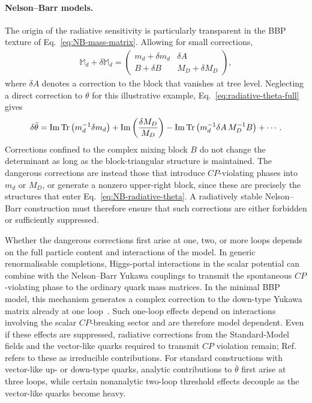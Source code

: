 \documentclass[review]{elsarticle}
\numberwithin{equation}{section}
\numberwithin{table}{section}
\numberwithin{figure}{section}
\def\tr{\mathrm{Tr}}
\begin{document}
\paragraph{Nelson--Barr models.}

The origin of the radiative sensitivity is particularly transparent in the BBP texture of Eq.~\eqref{eq:NB-mass-matrix}. Allowing for small corrections,
\begin{align}
    \mathbb M_d+\delta\mathbb M_d =
    \begin{pmatrix}
        m_d+\delta m_d & \delta A\\
        B+\delta B & M_D+\delta M_D
    \end{pmatrix},
    \label{eq:NB-radiative-matrix}
\end{align}
where $\delta A$ denotes a correction to the block that vanishes at tree level. Neglecting a direct correction to $\theta$ for this illustrative example, Eq.~\eqref{eq:radiative-theta-full} gives
\begin{align}
    \delta\bar\theta = {\rm Im}\,\tr
    \left(m_d^{-1}\delta m_d \right) 
    + {\rm Im} \left( \frac{\delta M_D}{M_D} \right) 
    - {\rm Im}\,\tr \left( m_d^{-1}\delta A\,M_D^{-1}B \right)
    +\cdots .
    \label{eq:NB-radiative-theta}
\end{align}
Corrections confined to the complex mixing block $B$ do not change the determinant as long as the block-triangular structure is maintained. The dangerous corrections are instead those that introduce $CP$-violating phases into $m_d$ or $M_D$, or generate a nonzero upper-right block, since these are precisely the structures that enter Eq.~\eqref{eq:NB-radiative-theta}. A radiatively stable Nelson--Barr construction must therefore ensure that such corrections are either forbidden or sufficiently suppressed.

Whether the dangerous corrections first arise at one, two, or more loops depends on the full particle content and interactions of the model. In generic renormalisable completions, Higgs-portal interactions in the scalar potential can combine with the Nelson--Barr Yukawa couplings to transmit the spontaneous $CP$-violating phase to the ordinary quark mass matrices. In the minimal BBP model, this mechanism generates a complex correction to the down-type Yukawa matrix already at one loop~\cite{Dine:2015jga}. Such one-loop effects depend on interactions involving the scalar $CP$-breaking sector and are therefore model dependent. Even if these effects are suppressed, radiative corrections from the Standard-Model fields and the vector-like quarks required to transmit $CP$ violation remain; Ref.~\cite{Valenti:2021xjp} refers to these as irreducible contributions. For standard constructions with vector-like up- or down-type quarks, analytic contributions to $\bar\theta$ first arise at three loops, while certain nonanalytic two-loop threshold effects decouple as the vector-like quarks become heavy. 
\end{document}
